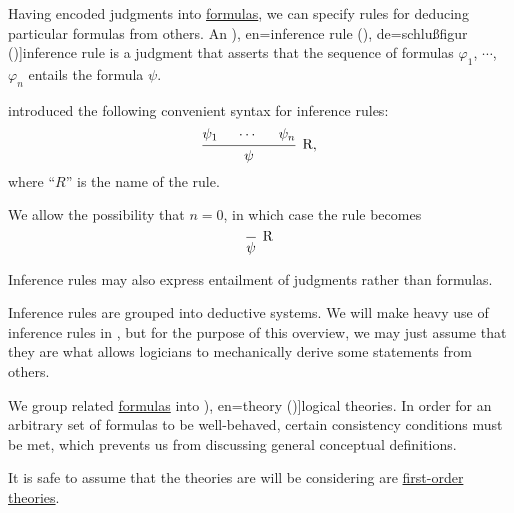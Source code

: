 \begin{definition}\label{def:inference_rule}\mimprovised
  Having encoded judgments into \hyperref[def:logical_formula]{formulas}, we can specify rules for deducing particular formulas from others. An \term[ru=правило вывода (\cite[31]{Герасимов2011}), en=inference rule (\cite[34]{Kleene2002Logic}), de=schlu\ss{}figur (\cite[181]{Gentzen1935})]{inference rule} is a judgment that asserts that the sequence of formulas \( \varphi_1 \), \( \cdots \), \( \varphi_n \) entails the formula \( \psi \).

   introduced the following convenient syntax for inference rules:
  \begin{equation*}
    \begin{prooftree}
      \hypo{ \psi_1 }
      \hypo{ \cdots }
      \hypo{ \psi_n }
      \infer3[R]{ \psi }
    \end{prooftree},
  \end{equation*}
  where \enquote{\( R \)} is the name of the rule.

  We allow the possibility that \( n = 0 \), in which case the rule becomes
  \begin{equation*}
    \begin{prooftree}
      \infer0[R]{ \psi }
    \end{prooftree}
  \end{equation*}

  Inference rules may also express entailment of judgments rather than formulas.
\end{definition}
\begin{comments}
  \item Inference rules are grouped into deductive systems. We will make heavy use of inference rules in , but for the purpose of this overview, we may just assume that they are what allows logicians to mechanically derive some statements from others.
\end{comments}

\begin{definition}\label{def:logical_theory}\mimprovised
   We group related \hyperref[def:logical_formula]{formulas} into \term[ru=теория (\cite[3.1.1]{Герасимов2011}), en=theory (\cite[7]{Hinman2005})]{logical theories}. In order for an arbitrary set of formulas to be well-behaved, certain consistency conditions must be met, which prevents us from discussing general conceptual definitions.

   It is safe to assume that the theories are will be considering are \hyperref[def:first_order_theory]{first-order theories}.
\end{definition}

